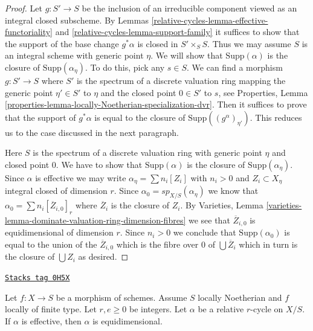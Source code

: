 \begin{proof}
Let $g : S' \to S$ be the inclusion of an irreducible component
viewed as an integral closed subscheme. By
Lemmas \ref{relative-cycles-lemma-effective-functoriality} and \ref{relative-cycles-lemma-support-family}
it suffices to show that the support of the base change
$g^*\alpha$ is closed in $S' \times_S S$.
Thus we may assume $S$ is an integral scheme with generic point
$\eta$. We will show that $\text{Supp}(\alpha)$ is the closure
of $\text{Supp}(\alpha_\eta)$. To do this, pick any $s \in S$.
We can find a morphism $g : S' \to S$ where $S'$ is the spectrum
of a discrete valuation ring mapping the generic point $\eta' \in S'$ to $\eta$
and the closed point $0 \in S'$ to $s$, see
Properties, Lemma \ref{properties-lemma-locally-Noetherian-specialization-dvr}.
Then it suffices to prove that the support of $g^*\alpha$
is equal to the closure of $\text{Supp}((g^\alpha)_{\eta'})$.
This reduces us to the case discussed in the next paragraph.

\medskip\noindent
Here $S$ is the spectrum of a discrete valuation ring with generic
point $\eta$ and closed point $0$. We have to show that
$\text{Supp}(\alpha)$ is the closure of $\text{Supp}(\alpha_\eta)$.
Since $\alpha$ is effective we may write $\alpha_\eta = \sum n_i[Z_i]$
with $n_i > 0$ and $Z_i \subset X_\eta$ integral closed of dimension $r$.
Since $\alpha_0 = sp_{X/S}(\alpha_\eta)$ we know that
$\alpha_0 = \sum n_i [\overline{Z}_{i, 0}]_r$ where $\overline{Z}_i$
is the closure of $Z_i$. By Varieties, Lemma
\ref{varieties-lemma-dominate-valuation-ring-dimension-fibres}
we see that $\overline{Z}_{i, 0}$ is equidimensional of dimension $r$.
Since $n_i > 0$ we conclude that $\text{Supp}(\alpha_0)$
is equal to the union of the $\overline{Z}_{i, 0}$ which
is the fibre over $0$ of $\bigcup \overline{Z}_i$ which
in turn is the closure of $\bigcup Z_i$ as desired.
\end{proof}

\begin{lemma}
\label{relative-cycles-lemma-effective-equidimensional}
\href{https://stacks.math.columbia.edu/tag/0H5X}{\texttt{Stacks tag 0H5X}}

Let $f : X \to S$ be a morphism of schemes. Assume $S$ locally Noetherian
and $f$ locally of finite type. Let $r, e \geq 0$ be integers.
Let $\alpha$ be a relative $r$-cycle on $X/S$.
If $\alpha$ is effective, then $\alpha$ is equidimensional.
\end{lemma}


